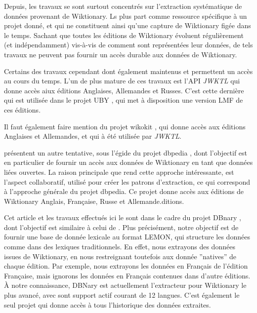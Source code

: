 \documentclass[10pt,a4paper,twoside]{article}
\begin{document}
Depuis, les travaux se sont surtout concentrés sur l'extraction systématique de données provenant de Wiktionary.  Ls plus part comme ressource spécifique à un projet donné, et qui ne constituent ainsi qu'une capture de Wiktionary figée dans le temps. Sachant que toutes les éditions de Wiktionary évoluent régulièrement (et indépendamment) vis-à-vis de comment sont représentées leur données, de tels travaux ne peuvent pas fournir un accès durable aux données de Wiktionary.


Certains des travaux cependant dont également maintenus et permettent un accès au cours du temps. L'un de plus mature de ces travaux est l'API \emph{JWKTL} \cite{ZeschMuellerGurevych2008} qui donne accès aiux éditions Anglaises, Allemandes et Russes. C'est cette dernière qui est utilisée dans le projet UBY \cite{gurevych2012uby}, qui met à disposition une version LMF de ces éditions.

Il faut également faire mention du projet wikokit \cite{krizhanovsky2010transformation}, qui donne accès  aux éditions Anglaises et Allemandes, et qui à été utilisée par \emph{JWKTL}.

\cite{HellmannSebastianandBrekleJonasandAuer} présentent un autre tentative, sous l'égide du projet dbpedia  \cite{dbpedia-swj}, dont l'objectif est en particulier de fournir un accès aux données de Wiktionary en tant que données liées ouvertes. La raison principale que rend cette approche intéressante, est l'aspect collaboratif, utilisé pour créer les patrons d'extraction, ce qui correspond à l'approche générale du projet dbpedia. Ce projet donne accès aux éditions de Wiktionary Anglais, Française, Russe et Allemande.ditions.

Cet article et les travaux effectués ici le sont dans le cadre du projet DBnary \cite{serasset:dbnary-swj}, dont l'objectif est similaire à celui de \cite{HellmannSebastianandBrekleJonasandAuer}. Plus précisément, notre objectif est de fournir une base de donnée lexicale au format LEMON, qui structure les données comme dans des lexiques traditionnels. En effet, nous extrayons des données issues de Wiktionary, en nous restreignant toutefois aux donnée ''natives'' de chaque édition. Par exemple, nous extrayons les données en Français de l'édition Française, mais ignorons les données en Français contenues dans d'autre éditions.
À notre connaissance, DBNary est actuellement l'extracteur pour Wiktionary le plus avancé, avec sont support actif courant de 12 langues. C'est également le seul projet qui donne accès à tous l'historique des données extraites. 
\end{document}
